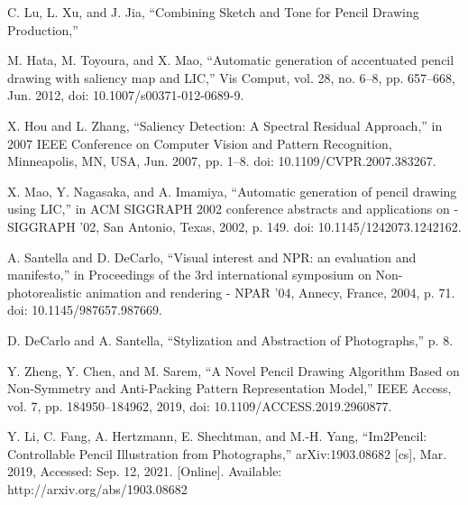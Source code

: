 \documentclass[letterpaper, 10 pt, conference]{ieeeconf}  %
\begin{document}
\begin{thebibliography}{99}

 C. Lu, L. Xu, and J. Jia, “Combining Sketch and Tone for Pencil Drawing Production,”

 M. Hata, M. Toyoura, and X. Mao, “Automatic generation of accentuated pencil drawing with saliency map and LIC,” Vis Comput, vol. 28, no. 6–8, pp. 657–668, Jun. 2012, doi: 10.1007/s00371-012-0689-9.

 X. Hou and L. Zhang, “Saliency Detection: A Spectral Residual Approach,” in 2007 IEEE Conference on Computer Vision and Pattern Recognition, Minneapolis, MN, USA, Jun. 2007, pp. 1–8. doi: 10.1109/CVPR.2007.383267.

 X. Mao, Y. Nagasaka, and A. Imamiya, “Automatic generation of pencil drawing using LIC,” in ACM SIGGRAPH 2002 conference abstracts and applications on   - SIGGRAPH ’02, San Antonio, Texas, 2002, p. 149. doi: 10.1145/1242073.1242162.

 A. Santella and D. DeCarlo, “Visual interest and NPR: an evaluation and manifesto,” in Proceedings of the 3rd international symposium on Non-photorealistic animation and rendering  - NPAR ’04, Annecy, France, 2004, p. 71. doi: 10.1145/987657.987669.

 D. DeCarlo and A. Santella, “Stylization and Abstraction of Photographs,” p. 8.

 Y. Zheng, Y. Chen, and M. Sarem, “A Novel Pencil Drawing Algorithm Based on Non-Symmetry and Anti-Packing Pattern Representation Model,” IEEE Access, vol. 7, pp. 184950–184962, 2019, doi: 10.1109/ACCESS.2019.2960877.

 Y. Li, C. Fang, A. Hertzmann, E. Shechtman, and M.-H. Yang, “Im2Pencil: Controllable Pencil Illustration from Photographs,” arXiv:1903.08682 [cs], Mar. 2019, Accessed: Sep. 12, 2021. [Online]. Available: http://arxiv.org/abs/1903.08682

\end{thebibliography}
\end{document}

